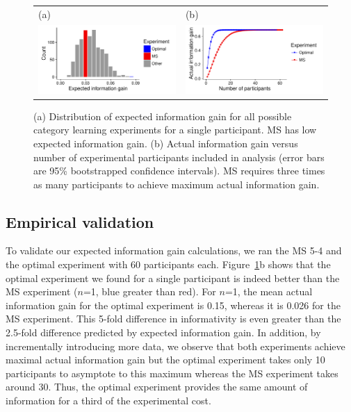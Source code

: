 \documentclass{article}
\begin{document}
\begin{figure}[t]
\centering
\begin{tabular}{l l}
(a) & (b)\\
\includegraphics[width=2.5in]{img/category-eig-dist.pdf} & \includegraphics[width=2.5in]{img/category-aig-curve.pdf}\\
\end{tabular}
\caption{(a) Distribution of expected information gain for all possible category learning experiments for a single participant. MS has low expected information gain. (b) Actual information gain versus number of experimental participants included in analysis (error bars are 95\% bootstrapped confidence intervals). MS requires three times as many participants to achieve maximum actual information gain.}
\label{fig:dist}
\end{figure}

\subsection{Empirical validation}

To validate our expected information gain calculations, we ran the MS 5-4 and the optimal experiment with 60 participants each.
Figure~\ref{fig:dist}b shows that the optimal experiment we found for a single participant is indeed better than the MS experiment ($n$=1, blue greater than red).
For $n$=1, the mean actual information gain for the optimal experiment is 0.15, whereas it is 0.026 for the MS experiment.
This 5-fold difference in informativity is even greater than the 2.5-fold difference  predicted by expected information gain.
In addition, by incrementally introducing more data, we observe that both experiments achieve maximal actual information gain but the optimal experiment takes only 10 participants to asymptote to this maximum whereas the MS experiment takes around 30.
Thus, the optimal experiment provides the same amount of information for a third of the experimental cost.
\end{document}
